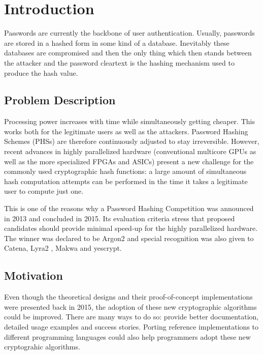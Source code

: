 \chapter{Introduction}
\label{sec:introduction}
Passwords are currently the backbone of user authentication. Usually, passwords are stored in a hashed form in some kind of a database. Inevitably these databases are compromised and then the only thing which then stands between the attacker and the password cleartext is the hashing mechanism used to produce the hash value.

\section{Problem Description}
Processing power increases with time while simultaneously getting cheaper. This works both for the legitimate users as well as the attackers. Password Hashing Schemes (PHSs) are therefore continuously adjusted to stay irreversible. However, recent advances in highly parallelized hardware (conventional multicore GPUs as well as the more specialized FPGAs and ASICs) present a new challenge for the commonly used cryptographic hash functions: a large amount of simultaneous hash computation attempts can be performed in the time it takes a legitimate user to compute just one.

This is one of the reasons why a Password Hashing Competition was announced in 2013 and concluded in 2015. Its evaluation criteria stress that proposed candidates should provide minimal speed-up for the highly parallelized hardware. The winner was declared to be Argon2 and special recognition was also given to Catena, Lyra2 \cite{andrade:2016:lyra2}, Makwa and yescrypt.

\section{Motivation}
Even though the theoretical designs and their proof-of-concept implementations were presented back in 2015, the adoption of these new cryptographic algorithms could be improved. There are many ways to do so: provide better documentation, detailed usage examples and success stories. Porting reference implementations to different programming languages could also help programmers adopt these new cryptograhic algorithms.

